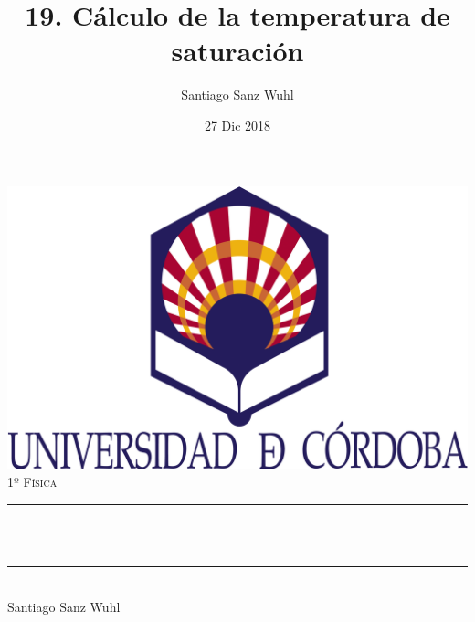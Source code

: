 \documentclass[12pt]{article}
\title{19. Cálculo de la temperatura de saturación}								%
\author{Santiago Sanz Wuhl}								%
\date{27 Dic 2018}											%
\makeatletter
\let\thetitle\@title
\makeatother
\begin{document}

\begin{titlepage}
	\centering
    \vspace*{0.5 cm}
    \includegraphics[scale = 0.15]{logo.png}\\[1.0 cm]	%
	\textsc{\Large 1º Física}\\[0.5 cm]				%
	\rule{\linewidth}{0.2 mm} \\[0.4 cm]
	{ \huge \bfseries \thetitle}\\
	\rule{\linewidth}{0.2 mm} \\[1.5 cm]
	 \large Santiago Sanz Wuhl

	
\end{titlepage}


\tableofcontents
\pagebreak

\end{document}

